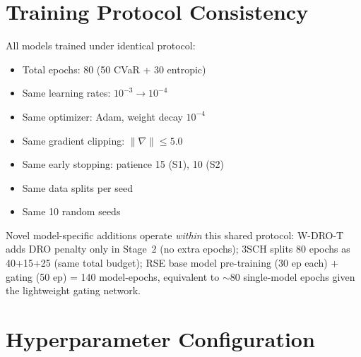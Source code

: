 \appendix

\section{Training Protocol Consistency}
\label{app:protocol}

All models trained under identical protocol:
\begin{itemize}[noitemsep]
    \item Total epochs: 80 (50 CVaR + 30 entropic)
    \item Same learning rates: $10^{-3} \to 10^{-4}$
    \item Same optimizer: Adam, weight decay $10^{-4}$
    \item Same gradient clipping: $\|\nabla\| \leq 5.0$
    \item Same early stopping: patience 15 (S1), 10 (S2)
    \item Same data splits per seed
    \item Same 10 random seeds
\end{itemize}

Novel model-specific additions operate \emph{within} this shared protocol: W-DRO-T adds DRO penalty only in Stage~2 (no extra epochs); 3SCH splits 80 epochs as 40+15+25 (same total budget); RSE base model pre-training (30 ep each) + gating (50 ep) = 140 model-epochs, equivalent to $\sim$80 single-model epochs given the lightweight gating network.

\section{Hyperparameter Configuration}
\label{app:hyper}

